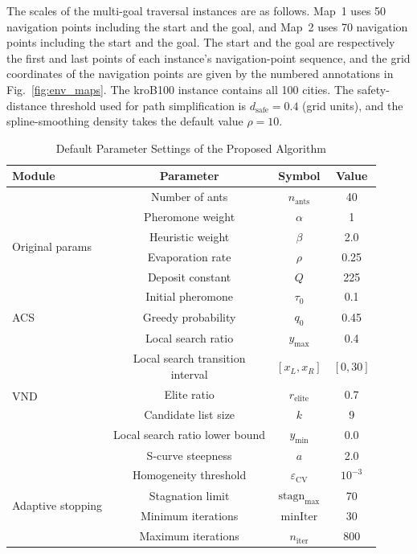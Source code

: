 The scales of the multi-goal traversal instances are as follows. Map~1 uses 50 navigation points including the start and the goal, and Map~2 uses 70 navigation points including the start and the goal. The start and the goal are respectively the first and last points of each instance's navigation-point sequence, and the grid coordinates of the navigation points are given by the numbered annotations in Fig.~\textcolor{blue}{\ref{fig:env_maps}}. The kroB100 instance contains all 100 cities. The safety-distance threshold used for path simplification is $d_{\mathrm{safe}} = 0.4$ (grid units), and the spline-smoothing density takes the default value $\rho = 10$.

\begin{table}[!ht]
\caption{Default Parameter Settings of the Proposed Algorithm}
\label{tab:params}
\centering
\scriptsize
\begin{tabular}{lccc}
\toprule
Module & Parameter & Symbol & Value \\
\midrule
\multirow{6}{*}{Original params}
& Number of ants & $n_{\mathrm{ants}}$ & 40 \\
& Pheromone weight & $\alpha$ & 1 \\
& Heuristic weight & $\beta$ & 2.0 \\
& Evaporation rate & $\rho$ & 0.25 \\
& Deposit constant & $Q$ & 225 \\
& Initial pheromone & $\tau_0$ & 0.1 \\
\midrule
\multirow{1}{*}{ACS}
& Greedy probability & $q_0$ & 0.45 \\
\midrule
\multirow{6}{*}{VND}
& Local search ratio & $y_{\max}$ & 0.4 \\
& \makecell{Local search transition\\interval} & $[x_L, x_R]$ & $[0, 30]$ \\
& Elite ratio & $r_{\mathrm{elite}}$ & 0.7 \\
& Candidate list size & $k$ & 9 \\
& Local search ratio lower bound & $y_{\min}$ & 0.0 \\
& S-curve steepness & $a$ & 2.0 \\
\midrule
\multirow{4}{*}{Adaptive stopping}
& Homogeneity threshold & $\varepsilon_{\mathrm{CV}}$ & $10^{-3}$ \\
& Stagnation limit & $\mathrm{stagn}_{\max}$ & 70 \\
& Minimum iterations & $\mathrm{minIter}$ & 30 \\
& Maximum iterations & $n_{\mathrm{iter}}$ & 800 \\
\bottomrule
\end{tabular}
\end{table}

